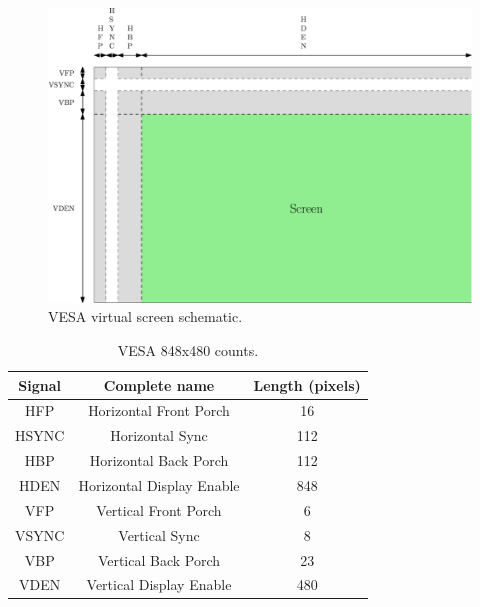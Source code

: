 \begin{figure}[H]
    \centering
    \includegraphics[width=\linewidth]{Chapter4-GPU_CLKU/res/screen_vesa}
    \caption{VESA virtual screen schematic.}
    \label{fig:gpu/screen_vesa}
\end{figure}

\begin{table}[H]
    \centering
    \begin{tabular}{|c|c|c|}
    \hline
    \rowcolor[HTML]{DAE8FC} 
    \textbf{Signal} & \textbf{Complete name}    & \multicolumn{1}{l|}{\cellcolor[HTML]{DAE8FC}\textbf{Length (pixels)}} \\ \hline
    HFP             & Horizontal Front Porch    & 16                                                                    \\ \hline
    HSYNC           & Horizontal Sync           & 112                                                                   \\ \hline
    HBP             & Horizontal Back Porch     & 112                                                                   \\ \hline
    HDEN            & Horizontal Display Enable & 848                                                                   \\ \hline
    VFP             & Vertical Front Porch      & 6                                                                     \\ \hline
    VSYNC           & Vertical Sync             & 8                                                                     \\ \hline
    VBP             & Vertical Back Porch       & 23                                                                    \\ \hline
    VDEN            & Vertical Display Enable   & 480                                                                   \\ \hline
    \end{tabular}
    \caption{VESA 848x480 counts.}
    \label{tab:gpu/vesa}
\end{table}

